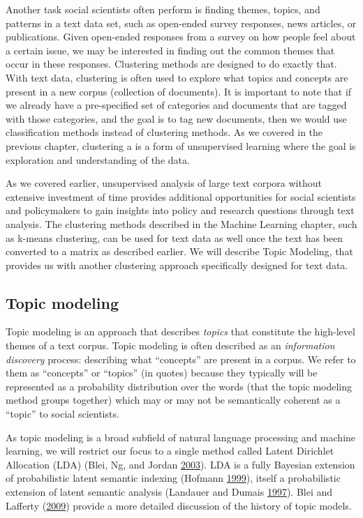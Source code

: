 \documentclass[]{krantz}
\begin{document}
Another task social scientists often perform is finding themes, topics,
and patterns in a text data set, such as open-ended survey responses,
news articles, or publications. Given open-ended responses from a survey
on how people feel about a certain issue, we may be interested in
finding out the common themes that occur in these responses. Clustering
methods are designed to do exactly that. With text data, clustering is
often used to explore what topics and concepts are present in a new
corpus (collection of documents). It is important to note that if we
already have a pre-specified set of categories and documents that are
tagged with those categories, and the goal is to tag new documents, then
we would use classification methods instead of clustering methods. As we
covered in the previous chapter, clustering a is a form of unsupervised
learning where the goal is exploration and understanding of the data.

As we covered earlier, unsupervised analysis of large text corpora
without extensive investment of time provides additional opportunities
for social scientists and policymakers to gain insights into policy and
research questions through text analysis. The clustering methods
described in the Machine Learning chapter, such as k-means clustering,
can be used for text data as well once the text has been converted to a
matrix as described earlier. We will describe Topic Modeling, that
provides us with another clustering approach specifically designed for
text data.

\subsection{Topic modeling}\label{sec:lda}

Topic modeling is an approach that describes \emph{topics} that
constitute the high-level themes of a text corpus. Topic modeling is
often described as an \emph{information discovery} process: describing
what ``concepts'' are present in a corpus. We refer to them as
``concepts'' or ``topics'' (in quotes) because they typically will be
represented as a probability distribution over the words (that the topic
modeling method groups together) which may or may not be semantically
coherent as a ``topic'' to social scientists.

As topic modeling is a broad subfield of natural language processing and
machine learning, we will restrict our focus to a single method called
Latent Dirichlet Allocation (LDA) (Blei, Ng, and Jordan
\protect\hyperlink{ref-blei-03}{2003}). LDA is a fully Bayesian
extension of probabilistic latent semantic indexing (Hofmann
\protect\hyperlink{ref-hofmann-99}{1999}), itself a probabilistic
extension of latent semantic analysis (Landauer and Dumais
\protect\hyperlink{ref-landauer-97}{1997}). Blei and Lafferty
(\protect\hyperlink{ref-blei-09}{2009}) provide a more detailed
discussion of the history of topic models.
\end{document}
